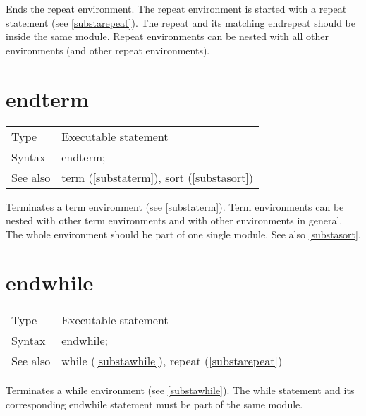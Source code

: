 \noindent Ends the repeat 
environment. The repeat environment is started 
with a repeat statement (see \ref{substarepeat}). The repeat and its 
matching endrepeat should be inside the same module. 
Repeat environments can be nested with all other environments (and other 
repeat environments). \vspace{10mm}


\section{endterm}
\label{substaendterm}

\noindent \begin{tabular}{ll}
Type & Executable statement\\
Syntax & endterm;
\\ See also & term (\ref{substaterm}), sort (\ref{substasort})
\end{tabular} \vspace{4mm}

\noindent Terminates a term environment 
(see \ref{substaterm}). Term environments can be nested with 
other term environments and with other environments in general. The whole 
environment should be part of one single module. See also \ref{substasort}. 
\vspace{10mm}


\section{endwhile}
\label{substaendwhile}

\noindent \begin{tabular}{ll}
Type & Executable statement\\
Syntax & endwhile;
\\ See also & while (\ref{substawhile}), repeat (\ref{substarepeat})
\end{tabular} \vspace{4mm}

\noindent Terminates a while environment (see \ref{substawhile}). The while 
statement and its corresponding endwhile statement must be part of the same 
module. \vspace{10mm}

